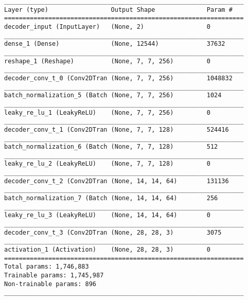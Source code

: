 \begin{lstlisting}[caption={\textsc{Mnist}-\ac{VAE} Decoder},captionpos=b,basicstyle=\tiny, label={lst:mnist-vae-decoder}]
_________________________________________________________________
Layer (type)                 Output Shape              Param #
=================================================================
decoder_input (InputLayer)   (None, 2)                 0
_________________________________________________________________
dense_1 (Dense)              (None, 12544)             37632
_________________________________________________________________
reshape_1 (Reshape)          (None, 7, 7, 256)         0
_________________________________________________________________
decoder_conv_t_0 (Conv2DTran (None, 7, 7, 256)         1048832
_________________________________________________________________
batch_normalization_5 (Batch (None, 7, 7, 256)         1024
_________________________________________________________________
leaky_re_lu_1 (LeakyReLU)    (None, 7, 7, 256)         0
_________________________________________________________________
decoder_conv_t_1 (Conv2DTran (None, 7, 7, 128)         524416
_________________________________________________________________
batch_normalization_6 (Batch (None, 7, 7, 128)         512
_________________________________________________________________
leaky_re_lu_2 (LeakyReLU)    (None, 7, 7, 128)         0
_________________________________________________________________
decoder_conv_t_2 (Conv2DTran (None, 14, 14, 64)        131136
_________________________________________________________________
batch_normalization_7 (Batch (None, 14, 14, 64)        256
_________________________________________________________________
leaky_re_lu_3 (LeakyReLU)    (None, 14, 14, 64)        0
_________________________________________________________________
decoder_conv_t_3 (Conv2DTran (None, 28, 28, 3)         3075
_________________________________________________________________
activation_1 (Activation)    (None, 28, 28, 3)         0
=================================================================
Total params: 1,746,883
Trainable params: 1,745,987
Non-trainable params: 896
_________________________________________________________________
\end{lstlisting}